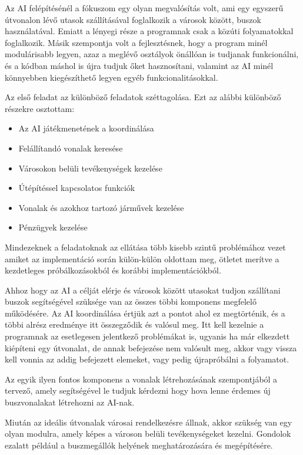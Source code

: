 
Az AI felépítésénél a fókuszom egy olyan megvalósítás volt, ami egy egyszerű útvonalon lévő utasok szállításával foglalkozik a városok között, buszok használatával. Emiatt a lényegi része a programnak csak a közúti folyamatokkal foglalkozik. Másik szempontja volt a fejlesztésnek, hogy a program minél modulárisabb legyen, azaz a meglévő osztályok önállóan is tudjanak funkcionálni, és a kódban máshol is újra tudjuk őket hasznosítani, valamint az AI minél könnyebben kiegészíthető legyen egyéb funkcionalitásokkal.


Az első feladat az különböző feladatok széttagolása. Ezt az alábbi különböző részekre osztottam:

\begin{itemize}
	\item Az AI játékmenetének a koordinálása
	\item Felállítandó vonalak keresése
	\item Városokon belüli tevékenységek kezelése
	\item Útépítéssel kapcsolatos funkciók
	\item Vonalak és azokhoz tartozó járművek kezelése
	\item Pénzügyek kezelése
\end{itemize}

Mindezeknek a feladatoknak az ellátása több kisebb szintű problémához vezet amiket az implementáció során külön-külön oldottam meg, ötletet merítve a kezdetleges próbálkozásokból és korábbi implementációkból.

Ahhoz hogy az AI a célját elérje és városok között utasokat tudjon szállítani buszok segítségével szüksége van az összes többi komponens megfelelő működésére. Az AI koordinálása értjük azt a pontot ahol ez megtörténik, és a többi alrész eredménye itt összegződik és valósul meg. Itt kell kezelnie a programnak az esetlegesen jelentkező problémákat is, ugyanis ha már elkezdett kiépíteni egy útvonalat, de annak befejezése nem valósult meg, akkor vagy vissza kell vonnia az addig befejezett elemeket, vagy pedig újrapróbálni a folyamatot.

Az egyik ilyen fontos komponens a vonalak létrehozásának szempontjából a tervező, amely segítségével le tudjuk kérdezni hogy hova lenne érdemes új buszvonalakat létrehozni az AI-nak.

Miután az ideális útvonalak városai rendelkezésre állnak, akkor szükség van egy olyan modulra, amely képes a városon belüli tevékenységeket kezelni. Gondolok ezalatt például a buszmegállók helyének meghatározására és megépítésére.

